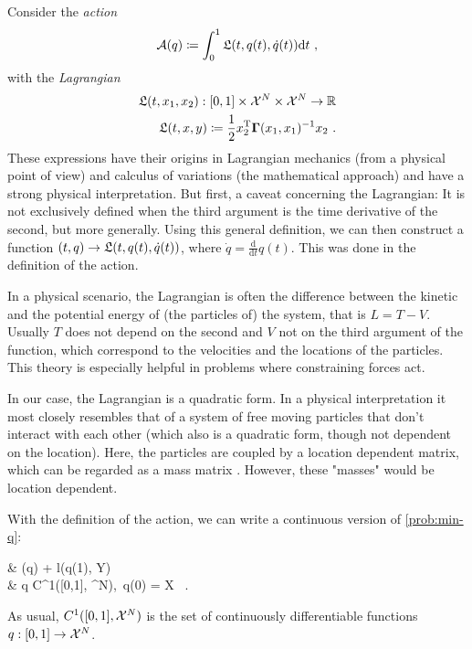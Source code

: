Consider the \emph{action}
\begin{equation}
\label{eq:action}
	\cA(q) \coloneqq \int_{0}^{1} \fL(t, q(t), \dot{q}(t)) \mathrm{d}t \ ,
\end{equation}
with the \emph{Lagrangian}
\begin{equation}
\label{eq:lagrangian}
	\begin{split}
		\mathfrak{L}(t, x_1, x_2): [0, 1] \times \mathcal{X}^N \times \mathcal{X}^N \rightarrow \mathbb{R}\\ \mathfrak{L}(t, x, y) \coloneqq \frac{1}{2}  x_2^\mathrm{T} \mathbf{\Gamma}(x_1, x_1)^{-1} x_2 \ .
	\end{split}
\end{equation}
These expressions have their origins in Lagrangian mechanics (from a physical point of view) and calculus of variations (the mathematical approach) and have a strong physical interpretation.
But first, a caveat concerning the Lagrangian:
It is not exclusively defined when the third argument is the time derivative of the second, but more generally.
Using this general definition, we can then construct a function $(t, q) \rightarrow \mathfrak{L}(t, q(t), \dot{q}(t))$, where $\dot{q} = \frac{\mathrm{d}}{\mathrm{d}t}q(t)$.
This was done in the definition of the action.

In a physical scenario, the Lagrangian is often the difference between the kinetic and the potential energy of (the particles of) the system, that is $L = T - V$.
Usually $T$ does not depend on the second and $V$ not on the third argument of the function, which correspond to the velocities and the locations of the particles.
This theory is especially helpful in problems where constraining forces act.

In our case, the Lagrangian is a quadratic form.
In a physical interpretation it most closely resembles that of a system of free moving particles that don't interact with each other (which also is a quadratic form, though not dependent on the location).
Here, the particles are coupled by a location dependent matrix, which can be regarded as a mass matrix \cite{marsden10}.
However, these "masses" would be location dependent.

With the definition of the action, we can write a continuous version of \cref{prob:min-q}:
\begin{problem}
\label{prob:cont-least-action}
	\begin{cases}
		 & \nu \cA(q) + l(q(1), Y)\\
		 & q \in C^1([0,1], \cX^N),\ q(0) = X \ .
	\end{cases}
\end{problem}
As usual, $C^1([0,1], \mathcal{X}^N)$ is the set of continuously differentiable functions $q: [0, 1] \rightarrow \mathcal{X}^N$.


